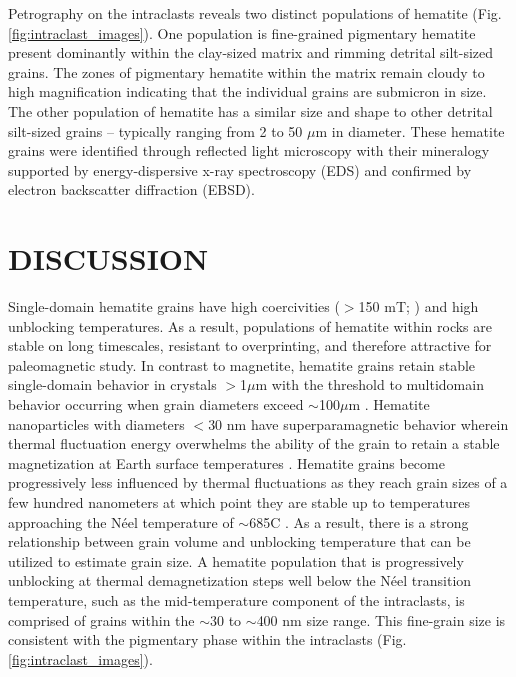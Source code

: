 \documentclass[11pt,letterpaper]{article}
\begin{document}
Petrography on the intraclasts reveals two distinct populations of hematite (Fig. \ref{fig:intraclast_images}). One population is fine-grained pigmentary hematite present dominantly within the clay-sized matrix and rimming detrital silt-sized grains. The zones of pigmentary hematite within the matrix remain cloudy to high magnification indicating that the individual grains are submicron in size. The other population of hematite has a similar size and shape to other detrital silt-sized grains  -- typically ranging from 2 to 50 $\mu$m in diameter. These hematite grains were identified through reflected light microscopy with their mineralogy supported by energy-dispersive x-ray spectroscopy (EDS) and confirmed by electron backscatter diffraction (EBSD). 



\section*{DISCUSSION}

Single-domain hematite grains have high coercivities ($>$150 mT; \citealp{Ozdemir2014a}) and high unblocking temperatures. As a result, populations of hematite within rocks are stable on long timescales, resistant to overprinting, and therefore attractive for paleomagnetic study. In contrast to magnetite, hematite grains retain stable single-domain behavior in crystals $>$1$\mu$m with the threshold to multidomain behavior occurring when grain diameters exceed $\sim$100$\mu$m \citep{Kletetschka2002a, Ozdemir2014a}. Hematite nanoparticles with diameters $<$30 nm have superparamagnetic behavior wherein thermal fluctuation energy overwhelms the ability of the grain to retain a stable magnetization at Earth surface temperatures \citep{Ozdemir2014a}. Hematite grains become progressively less influenced by thermal fluctuations as they reach grain sizes of a few hundred nanometers at which point they are stable up to temperatures approaching the N\'eel temperature of $\sim$685\textdegree C \citep{Swanson-Hysell2011a, Ozdemir2014a}. As a result, there is a strong relationship between grain volume and unblocking temperature that can be utilized to estimate grain size. A hematite population that is progressively unblocking at thermal demagnetization steps well below the N\'eel transition temperature, such as the mid-temperature component of the intraclasts, is comprised of grains within the $\sim$30 to $\sim$400 nm size range. This fine-grain size is consistent with the pigmentary phase within the intraclasts (Fig. \ref{fig:intraclast_images}).
\end{document}
